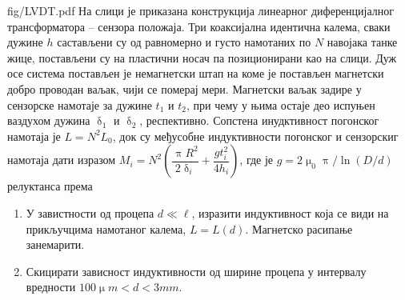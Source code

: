 \begin{slikaDesno}{fig/LVDT.pdf}
\PID 
На слици је приказана конструкција линеарног диференцијалног трансформатора -- сензора положаја.
 Три коаксијална идентична калема, сваки дужине $h$ састављени су од равномерно и густо намотаних по $N$ навојака танке жице, 
 постављени су на пластични носач па позиционирани као на слици. Дуж осе система постављен је немагнетски штап на коме је 
 постављен магнетски добро проводан ваљак, чији се померај мери. Магнетски ваљак задире у сензорске намотаје 
 за дужине $t_1$ и $t_2$, при чему у њима остаје део испуњен ваздухом дужина $\updelta_1$ и $\updelta_2$, респективно.
 Сопстена инудктивност погонског намотаја је $L = N^2 L_0$, док су међусобне индуктивности погонског и сензорскиг намотаја дати
 изразом
 $M_{i} = N^2 \left( \dfrac{\uppi R^2}{2\updelta_i} + \dfrac{gt_i^2}{4h_i}  \right)$, где је 
 $g = 2\upmu_0 \uppi/\ln(D/d)$ релуктанса према 
 
\end{slikaDesno}
 
\begin{enumerate}[label=(\alph*)]
\item У завистности од процепа $d \ll \ell$, изразити индуктивност која се види на прикључцима намотаног калема, $L = L(d)$. 
    Магнетско расипање занемарити.
\item Скицирати зависност индуктивности од ширине процепа у интервалу вредности $100\unit{\upmu m} < d < 3\unit{mm}$. 
\end{enumerate}